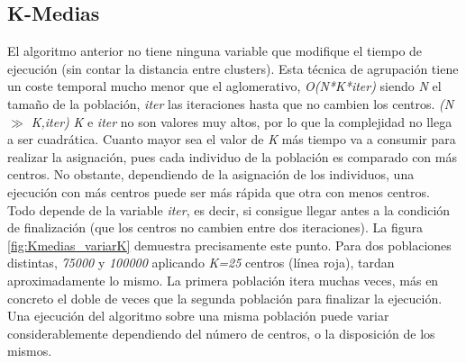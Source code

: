 	\subsection{K-Medias}	

		El algoritmo anterior no tiene ninguna variable que modifique el tiempo de ejecución (sin contar la distancia entre clusters). Esta técnica de agrupación tiene un coste temporal mucho menor que el aglomerativo, \textit{O(N*K*iter)} siendo \textit{N} el tamaño de la población, \textit{iter} las iteraciones  hasta que no cambien los centros. \textit{(N $\gg$ K,iter)} \textit{K} e \textit{iter} no son valores muy altos, por lo que la complejidad no llega a ser cuadrática. Cuanto mayor sea el valor de \textit{K} más tiempo va a consumir para realizar la asignación, pues cada individuo de la población es comparado con más centros. No obstante, dependiendo de la asignación de los individuos,  una ejecución con más centros puede ser más rápida que otra con menos centros. Todo depende de la variable \textit{iter}, es decir, si consigue llegar antes a la condición de finalización (que los centros no cambien entre dos iteraciones). La figura \ref{fig:Kmedias_variarK} demuestra precisamente este punto. Para dos poblaciones distintas, \textit{75000} y \textit{100000} aplicando \textit{K=25}  centros (línea roja), tardan aproximadamente lo mismo. La primera población itera muchas veces, más en concreto el doble de veces que la segunda población para finalizar la ejecución. Una ejecución del algoritmo sobre una misma población puede variar considerablemente dependiendo del número de centros, o la disposición de los mismos.
		
		
		
